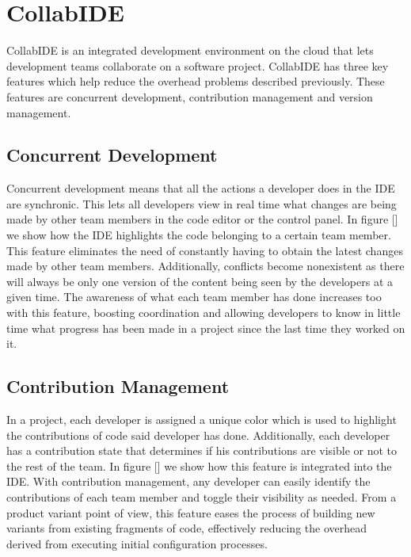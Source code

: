 
\section{CollabIDE}
\label{sec:collab-ide}

CollabIDE is an integrated development environment on the cloud that lets development teams 
collaborate on a software project. CollabIDE has three key features which help reduce the overhead 
problems described previously. These features are concurrent development, contribution management 
and version management.

\subsection{Concurrent Development}
Concurrent development means that all the actions a developer does in the IDE are synchronic. This lets all developers view in real time what changes are being made by other team members in the code editor or the control panel. In figure [] we show how the IDE highlights the code belonging to a certain team member. This feature eliminates the need of constantly having to obtain the latest changes made by other team members. Additionally, conflicts become nonexistent as there will always be only one version of the content being seen by the developers at a given time. The awareness of what each team member has done increases too with this feature, boosting coordination and allowing developers to know in little time what progress has been made in a project since the last time they worked on it.   

\subsection{Contribution Management}
In a project, each developer is assigned a unique color which is used to highlight the contributions of code said developer has done. Additionally, each developer has a contribution state that determines if his contributions are visible or not to the rest of the team. In figure [] we show how this feature is integrated into the IDE. With contribution management, any developer can easily identify the contributions of each team member and toggle their visibility as needed. From a product variant point of view, this feature eases the process of building new variants from existing fragments of code, effectively reducing the overhead derived from executing initial configuration processes.

